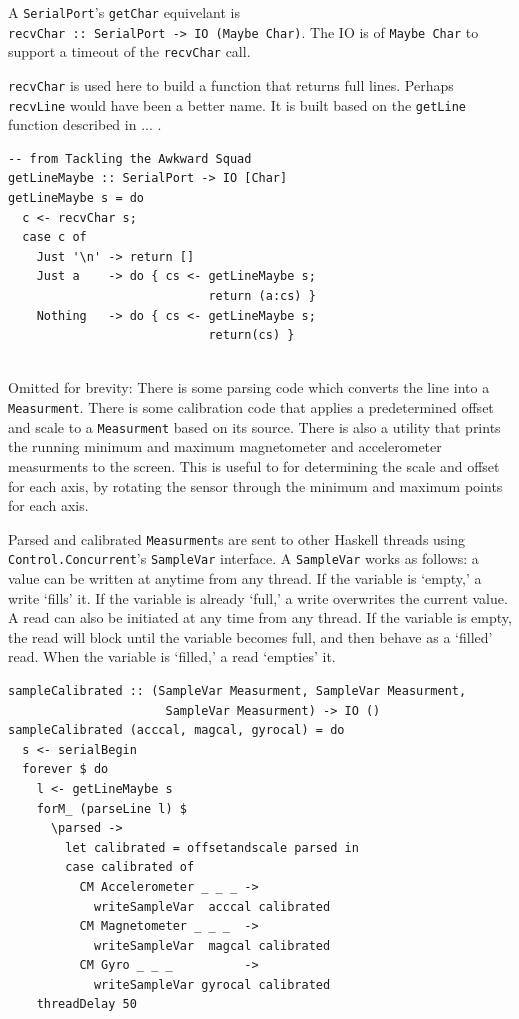 \documentclass[12pt]{report}
\begin{document}
A \lstinline$SerialPort$'s \lstinline$getChar$ equivelant is \\\lstinline$recvChar :: SerialPort -> IO (Maybe Char)$. The IO is of \lstinline$Maybe Char$ to support a timeout of the \lstinline$recvChar$ call. 

\lstinline$recvChar$ is used here to build a function that returns full lines. Perhaps \lstinline$recvLine$ would have been a better name. It is built based on the \lstinline$getLine$ function described in ... .

\begin{lstlisting}
-- from Tackling the Awkward Squad 
getLineMaybe :: SerialPort -> IO [Char] 
getLineMaybe s = do 
  c <- recvChar s;
  case c of
    Just '\n' -> return []
    Just a    -> do { cs <- getLineMaybe s;
                            return (a:cs) }
    Nothing   -> do { cs <- getLineMaybe s;
                            return(cs) }
       
\end{lstlisting}
Omitted for brevity:
There is some parsing code which converts the line into a \lstinline$Measurment$. 
There is some calibration code that applies a predetermined offset and scale to a \lstinline$Measurment$ based on its source.
There is also a utility that prints the running minimum and maximum magnetometer and accelerometer measurments to the screen. This is useful to for determining the scale and offset for each axis, by rotating the sensor through the minimum and maximum points for each axis. 

Parsed and calibrated \lstinline$Measurment$s are sent to other Haskell threads using \lstinline$Control.Concurrent$'s \lstinline$SampleVar$ interface. A \lstinline$SampleVar$ works as follows: a value can be written at anytime from any thread. If the variable is `empty,' a write `fills' it. If the variable is already `full,' a write overwrites the current value. A read can also be initiated at any time from any thread. If the variable is empty, the read will block until the variable becomes full, and then behave as a `filled' read. When the variable is `filled,' a read `empties' it. 

\begin{lstlisting}
sampleCalibrated :: (SampleVar Measurment, SampleVar Measurment, 
                      SampleVar Measurment) -> IO ()
sampleCalibrated (acccal, magcal, gyrocal) = do
  s <- serialBegin
  forever $ do
    l <- getLineMaybe s
    forM_ (parseLine l) $
      \parsed -> 
        let calibrated = offsetandscale parsed in
        case calibrated of 
          CM Accelerometer _ _ _ ->  
            writeSampleVar  acccal calibrated
          CM Magnetometer _ _ _  ->  
            writeSampleVar  magcal calibrated
          CM Gyro _ _ _          ->  
            writeSampleVar gyrocal calibrated
    threadDelay 50
\end{lstlisting}
\end{document}
